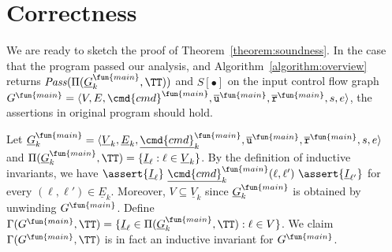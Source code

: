 
\section{Correctness}\label{sec:correctness}

We are ready to sketch the proof of Theorem~\ref{theorem:soundness}.
In the case that the program  passed our analysis,
and Algorithm~\ref{algorithm:overview} returns
$\mathit{Pass} (\Pi (\underline{G}^{\fun{main}}_k, \TT))$ and
$S[\bullet]$ on the input control flow graph $G^\fun{main} = \langle V, E,
\cmd{cmd}^\fun{main}, \overline{\mathtt{u}}^\fun{main},
\overline{\mathtt{r}}^\fun{main},s,e \rangle$,
the assertions in original program  should hold.

Let $\underline{G}^{\fun{main}}_k = \langle \underline{V}_k, \underline{E}_k,
\underline{\cmd{cmd}}_k^\fun{main} , \overline{\mathtt{u}}^\fun{main},
\overline{\mathtt{r}}^\fun{main},s,e \rangle$ and
$\Pi (\underline{G}^{\fun{main}}_k, \TT)
= \{ \underline{I}_{\ell}: \ell \in \underline{V}_k \}$.
By the definition of inductive invariants, we have
$\assert{\underline{I}_{\ell}}\ \underline{\cmd{cmd}}_k^\fun{main} (\ell, \ell')\ \assert{\underline{I}_{\ell'}}$
for every $(\ell, \ell') \in  \underline{E}_k$. Moreover, $V \subseteq  \underline{V}_k$ since
$\underline{G}^{\fun{main}}_k$ is obtained by unwinding $G^\fun{main}$. Define 
$\Gamma (G^\fun{main}, \TT) = \{ \underline{I}_{\ell} \in \Pi (\underline{G}^{\fun{main}}_k,
\TT) : \ell \in V \}$. We claim $\Gamma (G^\fun{main}, \TT)$
is in fact an inductive invariant for $G^\fun{main}$. 

